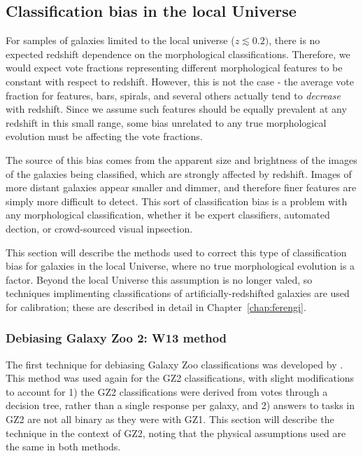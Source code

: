  
\subsection{Classification bias in the local Universe}

For samples of galaxies limited to the local universe ($z\lesssim0.2)$, there is no expected redshift dependence on the morphological classifications. Therefore, we would expect vote fractions representing different morphological features to be constant with respect to redshift. However, this is not the case - the average vote fraction for features, bars, spirals, and several others actually tend to \emph{decrease} with redshift. Since we assume such features should be equally prevalent at any redshift in this small range, some bias unrelated to any true morphological evolution must be affecting the vote fractions. 

The source of this bias comes from the apparent size and brightness of the images of the galaxies being classified, which are strongly affected by redshift. Images of more distant galaxies appear smaller and dimmer, and therefore finer features are simply more difficult to detect. This sort of classification bias is a problem with any morphological classification, whether it be expert classifiers, automated dection, or crowd-sourced visual inpsection.

This section will describe the methods used to correct this type of classification bias for galaxies in the local Universe, where no true morphological evolution is a factor. Beyond the local Universe this assumption is no longer valed, so techniques implimenting classifications of artificially-redshifted galaxies are used for calibration; these are described in detail in Chapter~\ref{chap:ferengi}. 

\subsubsection{Debiasing Galaxy Zoo 2: W13 method}

The first technique for debiasing Galaxy Zoo classifications was developed by \citet{Bamford2009}. This method was used again for the GZ2 classifications, with slight modifications to account for 1) the GZ2 classifications were derived from votes through a decision tree, rather than a single response per galaxy, and 2) answers to tasks in GZ2 are not all binary as they were with GZ1. This section will describe the technique in the context of GZ2, noting that the physical assumptions used are the same in both methods.  

